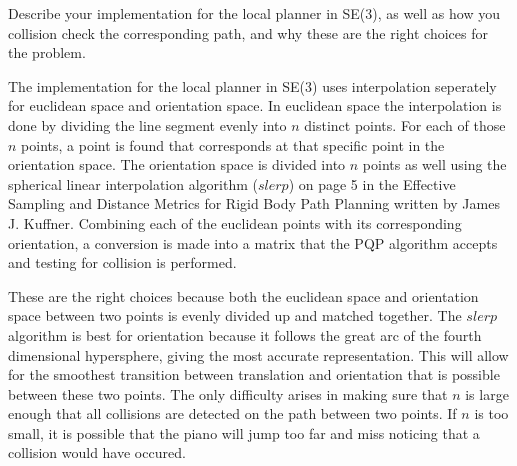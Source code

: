 \question{[5]}

Describe your implementation for the local planner in SE(3), as well as how you
collision check the corresponding path, and why these are the right choices
for the problem.

The implementation for the local planner in SE(3) uses interpolation seperately
for euclidean space and orientation space. In euclidean space the interpolation
is done by dividing the line segment evenly into $n$ distinct points. For each
of those $n$ points, a point is found that corresponds at that specific point
in the orientation space. The orientation space is divided into $n$ points as
well using the spherical linear interpolation algorithm ($slerp$) on page 5 in the
Effective Sampling and Distance Metrics for Rigid Body Path Planning written
by James J. Kuffner. Combining each of the euclidean points with its
corresponding orientation, a conversion is made into a matrix that the PQP
algorithm accepts and testing for collision is performed.

These are the right choices because both the euclidean space and orientation
space between two points is evenly divided up and matched together. The $slerp$
algorithm is best for orientation because it follows the great arc of the
fourth dimensional hypersphere, giving the most accurate representation.
This will allow for the smoothest transition between translation and orientation
that is possible between these two points. The only difficulty arises in making
sure that $n$ is large enough that all collisions are detected on the path
between two points. If $n$ is too small, it is possible that the piano will jump
too far and miss noticing that a collision would have occured.